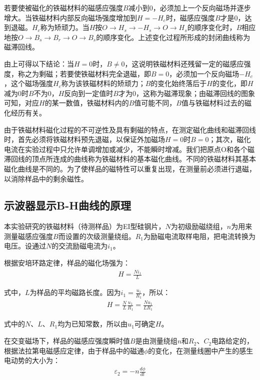 ﻿\documentclass[12pt,a4paper]{article}
\begin{document}
若要使被磁化的铁磁材料的磁感应强度$B$减小到0，必须加上一个反向磁场并逐步增大。当铁磁材料内部反向磁场强度增加到$H=-H_c$时，磁感应强度$B$才是0，达到退磁。$H_c$称为矫顽力。当$H$按$O \to H_s \to -H_s \to O \to H_s$的顺序变化时，$B$相应地按$O \to B_s \to B_r \to O \to B_s$的顺序变化。上述变化过程所形成的封闭曲线称为磁滞回线。

由上可得以下结论：当$H=0$时，$B \neq 0$，这说明铁磁材料还残留一定的磁感应强度，称之为剩磁；若要使铁磁材料完全退磁，即$B=0$，必须加一个反向磁场$-H_c$，这个磁场强度$H_c$称为该铁磁材料的矫顽力；$B$的变化始终落后于$H$的变化，即$H$减为0时$B$不为0，$H$反向到一定值时$B$才为0，这称为磁滞现象；由磁滞回线的图象可知，对应$H$的某一数值，铁磁材料内的$B$值可能不同，$B$值与铁磁材料过去的磁化经历有关。

由于铁磁材料磁化过程的不可逆性及具有剩磁的特点，在测定磁化曲线和磁滞回线时，首先必须将铁磁材料预先退磁，以保证外加磁场$H=0$时$B=0$；其次，磁化电流在实验过程中只允许单调增加或减少，不能瞬时增减。我们把原点O和各个磁滞回线的顶点所连成的曲线称为铁磁材料的基本磁化曲线。不同的铁磁材料其基本磁化曲线是不同的。为了使样品的磁特性可以重复出现，在测量前必须进行退磁，以消除样品中的剩余磁性。

\subsection{示波器显示B-H曲线的原理}

本实验研究的铁磁材料（待测样品）为EI型硅钢片，$N$为初级励磁绕组，$n$为用来测量磁感应强度$B$而设置的次级测量绕组。$R_1$为励磁电流取样电阻，把电流转换为电压。设通过$N$的交流励磁电流为$i_1$。

根据安培环路定律，样品的磁化场强为：
\begin{align}
H = \frac{Ni_1}{L} \tag{2}
\end{align}

式中，$L$为样品的平均磁路长度。因为$i_1 = \frac{u_1}{R_1}$，所以：
\begin{align}
H = \frac{N}{L}\frac{u_1}{R_1} = \frac{Nu_1}{LR_1} \tag{3}
\end{align}

式中的$N$、$L$、$R_1$均为已知常数，所以由$u_1$可确定$H$。

在交变磁场下，样品的磁感应强度瞬时值$B$是由测量绕组$n$和$R_2$、$C_2$电路给定的，根据法拉第电磁感应定律，由于样品中的磁通$\phi$的变化，在测量线圈中产生的感生电动势的大小为：
\begin{align}
\varepsilon_2 = -n\frac{d\phi}{dt}
\end{align}
\end{document}
